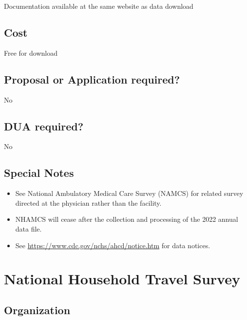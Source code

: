 \documentclass[
]{book}
\providecommand{\tightlist}{%
  \setlength{\itemsep}{0pt}\setlength{\parskip}{0pt}}
\begin{document}
Documentation available at the same website as data download

\hypertarget{cost-51}{%
\section{Cost}\label{cost-51}}

Free for download

\hypertarget{proposal-or-application-required-51}{%
\section{Proposal or Application required?}\label{proposal-or-application-required-51}}

No

\hypertarget{dua-required-51}{%
\section{DUA required?}\label{dua-required-51}}

No

\hypertarget{special-notes-51}{%
\section{Special Notes}\label{special-notes-51}}

\begin{itemize}
\tightlist
\item
  See National Ambulatory Medical Care Survey (NAMCS) for related survey directed at the physician rather than the facility.
\item
  NHAMCS will cease after the collection and processing of the 2022 annual data file.
\item
  See \url{https://www.cdc.gov/nchs/ahcd/notice.htm} for data notices.
\end{itemize}

\mainmatter

\hypertarget{national-household-travel-survey}{%
\chapter{National Household Travel Survey}\label{national-household-travel-survey}}

\hypertarget{organization-52}{%
\section{Organization}\label{organization-52}}
\end{document}
